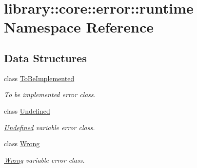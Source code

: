 \hypertarget{namespacelibrary_1_1core_1_1error_1_1runtime}{}\section{library\+:\+:core\+:\+:error\+:\+:runtime Namespace Reference}
\label{namespacelibrary_1_1core_1_1error_1_1runtime}
\subsection*{Data Structures}
\begin{DoxyCompactItemize}
\item 
class \hyperlink{classlibrary_1_1core_1_1error_1_1runtime_1_1ToBeImplemented}{To\+Be\+Implemented}
\begin{DoxyCompactList}\small\item\em To be implemented error class. \end{DoxyCompactList}\item 
class \hyperlink{classlibrary_1_1core_1_1error_1_1runtime_1_1Undefined}{Undefined}
\begin{DoxyCompactList}\small\item\em \hyperlink{classlibrary_1_1core_1_1error_1_1runtime_1_1Undefined}{Undefined} variable error class. \end{DoxyCompactList}\item 
class \hyperlink{classlibrary_1_1core_1_1error_1_1runtime_1_1Wrong}{Wrong}
\begin{DoxyCompactList}\small\item\em \hyperlink{classlibrary_1_1core_1_1error_1_1runtime_1_1Wrong}{Wrong} variable error class. \end{DoxyCompactList}\end{DoxyCompactItemize}
